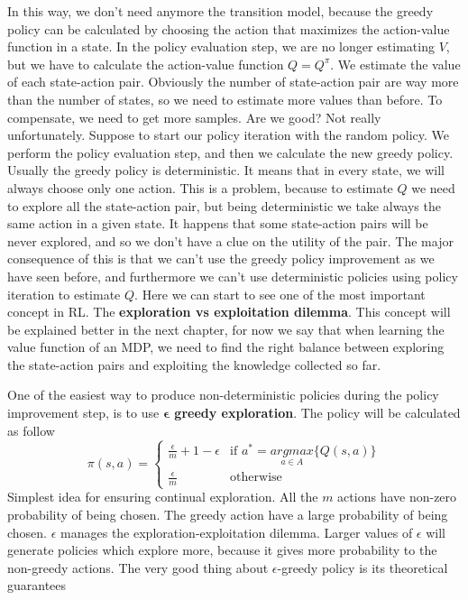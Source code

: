 \documentclass[../main.tex]{subfiles}
\begin{document}
In this way, we don't need anymore the transition model, because the greedy policy can be calculated by choosing the action that maximizes the action-value function in a state. In the policy evaluation step, we are no longer estimating $V$, but we have to calculate the action-value function $Q = Q^{\pi}$. We estimate the value of each state-action pair. Obviously the number of state-action pair are way more than the number of states, so we need to estimate more values than before. To compensate, we need to get more samples. Are we good? Not really unfortunately. Suppose to start our policy iteration with the random policy. We perform the policy evaluation step, and then we calculate the new greedy policy. Usually the greedy policy is deterministic. It means that in every state, we will always choose only one action. This is a problem, because to estimate $Q$ we need to explore all the state-action pair, but being deterministic we take always the same action in a given state. It happens that some state-action pairs will be never explored, and so we don't have a clue on the utility of the pair. The major consequence of this is that we can't use the greedy policy improvement as we have seen before, and furthermore we can't use deterministic policies using policy iteration to estimate $Q$. Here we can start to see one of the most important concept in RL. The \textbf{exploration vs exploitation dilemma}. This concept will be explained better in the next chapter, for now we say that when learning the value function of an MDP, we need to find the right balance between exploring the state-action pairs and exploiting the knowledge collected so far.
\par
\noindent
One of the easiest way to produce non-deterministic policies during the policy improvement step, is to use \textbf{$\mathbf{\epsilon}$ greedy exploration}. The policy will be calculated as follow
\begin{equation}
    \pi(s,a) =
    \begin{cases}
        \frac{\epsilon}{m}+1-\epsilon & \text{if }a^*=\underset{a \in A}{argmax} \{ Q(s,a) \} \\
        \frac{\epsilon}{m}            & \text{otherwise}
    \end{cases}
\end{equation}
Simplest idea for ensuring continual exploration. All the $m$ actions have non-zero probability of being chosen. The greedy action have a large probability of being chosen. $\epsilon$ manages the exploration-exploitation dilemma. Larger values of $\epsilon$ will generate policies which explore more, because it gives more probability to the non-greedy actions. The very good thing about $\epsilon$-greedy policy is its theoretical guarantees
\end{document}
